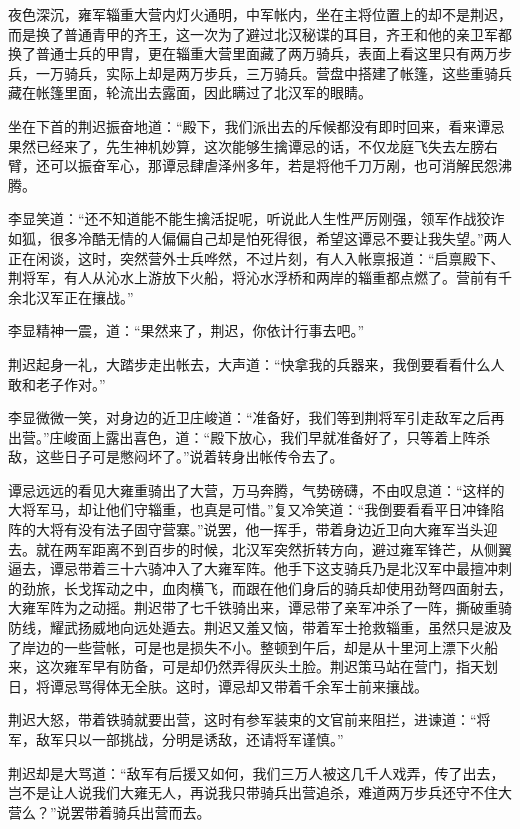夜色深沉，雍军辎重大营内灯火通明，中军帐内，坐在主将位置上的却不是荆迟，而是换了普通青甲的齐王，这一次为了避过北汉秘谍的耳目，齐王和他的亲卫军都换了普通士兵的甲胄，更在辎重大营里面藏了两万骑兵，表面上看这里只有两万步兵，一万骑兵，实际上却是两万步兵，三万骑兵。营盘中搭建了帐篷，这些重骑兵藏在帐篷里面，轮流出去露面，因此瞒过了北汉军的眼睛。

坐在下首的荆迟振奋地道：“殿下，我们派出去的斥候都没有即时回来，看来谭忌果然已经来了，先生神机妙算，这次能够生擒谭忌的话，不仅龙庭飞失去左膀右臂，还可以振奋军心，那谭忌肆虐泽州多年，若是将他千刀万剐，也可消解民怨沸腾。

李显笑道：“还不知道能不能生擒活捉呢，听说此人生性严厉刚强，领军作战狡诈如狐，很多冷酷无情的人偏偏自己却是怕死得很，希望这谭忌不要让我失望。”两人正在闲谈，这时，突然营外士兵哗然，不过片刻，有人入帐禀报道：“启禀殿下、荆将军，有人从沁水上游放下火船，将沁水浮桥和两岸的辎重都点燃了。营前有千余北汉军正在攘战。”

李显精神一震，道：“果然来了，荆迟，你依计行事去吧。”

荆迟起身一礼，大踏步走出帐去，大声道：“快拿我的兵器来，我倒要看看什么人敢和老子作对。”

李显微微一笑，对身边的近卫庄峻道：“准备好，我们等到荆将军引走敌军之后再出营。”庄峻面上露出喜色，道：“殿下放心，我们早就准备好了，只等着上阵杀敌，这些日子可是憋闷坏了。”说着转身出帐传令去了。

谭忌远远的看见大雍重骑出了大营，万马奔腾，气势磅礴，不由叹息道：“这样的大将军马，却让他们守辎重，也真是可惜。”复又冷笑道：“我倒要看看平日冲锋陷阵的大将有没有法子固守营寨。”说罢，他一挥手，带着身边近卫向大雍军当头迎去。就在两军距离不到百步的时候，北汉军突然折转方向，避过雍军锋芒，从侧翼逼去，谭忌带着三十六骑冲入了大雍军阵。他手下这支骑兵乃是北汉军中最擅冲刺的劲旅，长戈挥动之中，血肉横飞，而跟在他们身后的骑兵却使用劲弩四面射去，大雍军阵为之动摇。荆迟带了七千铁骑出来，谭忌带了亲军冲杀了一阵，撕破重骑防线，耀武扬威地向远处遁去。荆迟又羞又恼，带着军士抢救辎重，虽然只是波及了岸边的一些营帐，可是也是损失不小。整顿到午后，却是从十里河上漂下火船来，这次雍军早有防备，可是却仍然弄得灰头土脸。荆迟策马站在营门，指天划日，将谭忌骂得体无全肤。这时，谭忌却又带着千余军士前来攘战。

荆迟大怒，带着铁骑就要出营，这时有参军装束的文官前来阻拦，进谏道：“将军，敌军只以一部挑战，分明是诱敌，还请将军谨慎。”

荆迟却是大骂道：“敌军有后援又如何，我们三万人被这几千人戏弄，传了出去，岂不是让人说我们大雍无人，再说我只带骑兵出营追杀，难道两万步兵还守不住大营么？”说罢带着骑兵出营而去。


